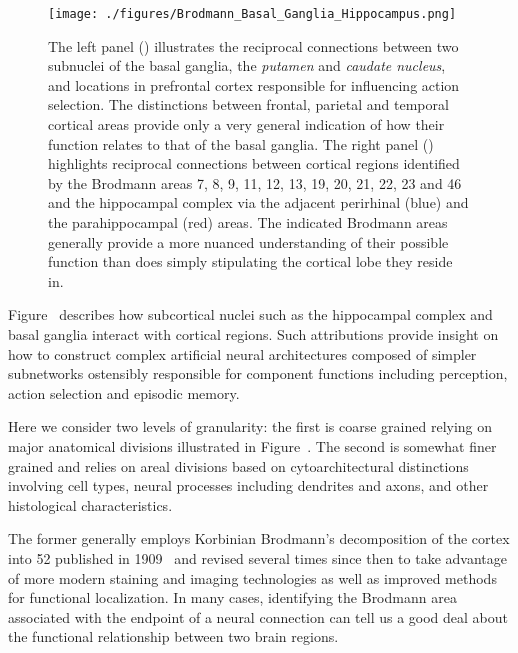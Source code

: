 \begin{figure}
%
  \begin{center} 
    \texttt{[image: ./figures/Brodmann\_Basal\_Ganglia\_Hippocampus.png]} %
  \end{center}
%
  \caption{The left panel ({}) illustrates the reciprocal connections between two subnuclei of the basal ganglia, the {\it{putamen}} and {\it{caudate nucleus}}, and locations in prefrontal cortex responsible for influencing action selection. The distinctions between frontal, parietal and temporal cortical areas provide only a very general indication of how their function relates to that of the basal ganglia. The right panel ({}) highlights reciprocal connections between cortical regions {\emdash{}} identified by the Brodmann areas 7, 8, 9, 11, 12, 13, 19, 20, 21, 22, 23 and 46 {\emdash{}} and the hippocampal complex via the adjacent perirhinal (blue) and the parahippocampal (red) areas. The indicated Brodmann areas generally provide a more nuanced understanding of their possible function than does simply stipulating the cortical lobe they reside in.}
%    
  \label{fig_broadman}
%
\end{figure}


Figure~{} describes how subcortical nuclei such as the hippocampal complex and basal ganglia interact with cortical regions. Such attributions provide insight on how to construct complex artificial neural architectures composed of simpler subnetworks ostensibly responsible for component functions including perception, action selection and episodic memory.

Here we consider two levels of granularity: the first is coarse grained relying on major anatomical divisions illustrated in Figure~{}. The second is somewhat finer grained and relies on areal divisions based on cytoarchitectural distinctions involving cell types, neural processes including dendrites and axons, and other histological characteristics.

The former generally employs Korbinian Brodmann's decomposition of the cortex into 52 {} published in 1909~\cite{Brodmann1909} and revised several times since then to take advantage of more modern staining and imaging technologies as well as improved methods for functional localization. In many cases, identifying the Brodmann area associated with the endpoint of a neural connection can tell us a good deal about the functional relationship between two brain regions.

